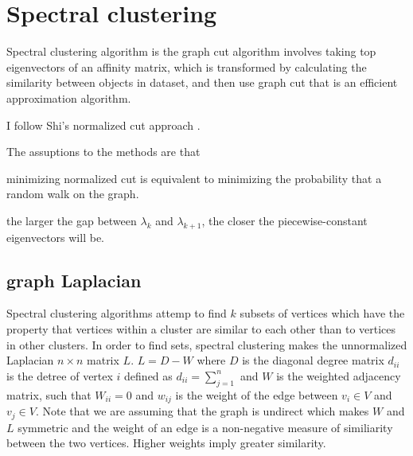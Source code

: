 \section{Spectral clustering}
Spectral clustering algorithm is the graph cut algorithm involves taking top eigenvectors of an affinity matrix, which is transformed by calculating the similarity between objects in dataset, and then use graph cut that is an efficient approximation algorithm. 

I follow Shi's normalized cut approach \cite{jianbo03}. 

The assuptions to the methods are that \begin{inparaenum}
\item minimizing normalized cut is equivalent to minimizing the probability that a random walk on the graph.
\item the larger the gap between $\lambda_{k}$ and $\lambda_{k+1}$, the closer the piecewise-constant eigenvectors will be.
\end{inparaenum}

\subsection{graph Laplacian}
Spectral clustering algorithms attemp to find $k$ subsets of vertices which have the property that vertices within a cluster are similar to each other than to vertices in other clusters. 
In order to find sets, spectral clustering makes the unnormalized Laplacian $n \times n$ matrix $L$. 
$L = D - W$ where $D$ is the diagonal degree matrix $d_{ii}$ is the detree of vertex $i$ defined as $d_{ii} = \sum_{j=1}^n$ and $W$ is the weighted adjacency matrix, such that $W_{ii} = 0$ and $w_{ij}$ is the weight of the edge between $v_i \in V$ and $v_j \in V$.
Note that we are assuming that the graph is undirect which makes $W$ and $L$ symmetric and the weight of an edge is a non-negative measure of similiarity between the two vertices. 
Higher weights imply greater similarity. 

